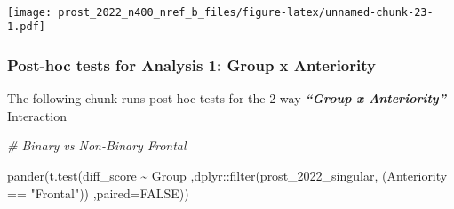 \documentclass[
]{article}
\newenvironment{Shaded}{\begin{snugshade}}{\end{snugshade}}
\newcommand{\AttributeTok}[1]{\textcolor[rgb]{0.77,0.63,0.00}{#1}}
\newcommand{\CommentTok}[1]{\textcolor[rgb]{0.56,0.35,0.01}{\textit{#1}}}
\newcommand{\ConstantTok}[1]{\textcolor[rgb]{0.00,0.00,0.00}{#1}}
\newcommand{\FunctionTok}[1]{\textcolor[rgb]{0.00,0.00,0.00}{#1}}
\newcommand{\NormalTok}[1]{#1}
\newcommand{\SpecialCharTok}[1]{\textcolor[rgb]{0.00,0.00,0.00}{#1}}
\newcommand{\StringTok}[1]{\textcolor[rgb]{0.31,0.60,0.02}{#1}}
\begin{document}
~

\texttt{[image: prost\_2022\_n400\_nref\_b\_files/figure-latex/unnamed-chunk-23-1.pdf]}

\hypertarget{post-hoc-tests-for-analysis-1-group-x-anteriority}{%
\subsubsection{Post-hoc tests for Analysis 1: Group x
Anteriority}\label{post-hoc-tests-for-analysis-1-group-x-anteriority}}

The following chunk runs post-hoc tests for the 2-way
\textbf{\emph{``Group x Anteriority''}} Interaction

\begin{Shaded}
\begin{Highlighting}[]
\CommentTok{\# Binary vs Non{-}Binary Frontal}

\FunctionTok{pander}\NormalTok{(}\FunctionTok{t.test}\NormalTok{(diff\_score }\SpecialCharTok{\textasciitilde{}}\NormalTok{ Group}
\NormalTok{       ,dplyr}\SpecialCharTok{::}\FunctionTok{filter}\NormalTok{(prost\_2022\_singular, (Anteriority }\SpecialCharTok{==} \StringTok{"Frontal"}\NormalTok{))}
\NormalTok{       ,}\AttributeTok{paired=}\ConstantTok{FALSE}\NormalTok{))}
\end{Highlighting}
\end{Shaded}
\end{document}
